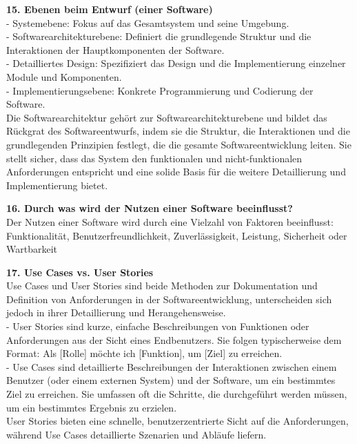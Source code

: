 \documentclass{article}
\begin{document}
\textbf{15. Ebenen beim Entwurf (einer Software)}\\
- Systemebene: Fokus auf das Gesamtsystem und seine Umgebung. \\
- Softwarearchitekturebene: Definiert die grundlegende Struktur und die Interaktionen der Hauptkomponenten der Software. \\
- Detailliertes Design: Spezifiziert das Design und die Implementierung einzelner Module und Komponenten. \\
- Implementierungsebene: Konkrete Programmierung und Codierung der Software. \\
Die Softwarearchitektur gehört zur Softwarearchitekturebene und bildet das Rückgrat des Softwareentwurfs, indem sie die Struktur, die Interaktionen und die grundlegenden Prinzipien festlegt, die die gesamte Softwareentwicklung leiten. Sie stellt sicher, dass das System den funktionalen und nicht-funktionalen Anforderungen entspricht und eine solide Basis für die weitere Detaillierung und Implementierung bietet.\\
\textbf{16. Durch was wird der Nutzen einer Software beeinflusst?}\\
Der Nutzen einer Software wird durch eine Vielzahl von Faktoren beeinflusst: Funktionalität, Benutzerfreundlichkeit, Zuverlässigkeit, Leistung, Sicherheit oder Wartbarkeit \\
\textbf{17. Use Cases vs. User Stories}\\
Use Cases und User Stories sind beide Methoden zur Dokumentation und Definition von Anforderungen in der Softwareentwicklung, unterscheiden sich jedoch in ihrer Detaillierung und Herangehensweise.\\
- User Stories sind kurze, einfache Beschreibungen von Funktionen oder Anforderungen aus der Sicht eines Endbenutzers. Sie folgen typischerweise dem Format: Als [Rolle] möchte ich [Funktion], um [Ziel] zu erreichen.\\
- Use Cases sind detaillierte Beschreibungen der Interaktionen zwischen einem Benutzer (oder einem externen System) und der Software, um ein bestimmtes Ziel zu erreichen. Sie umfassen oft die Schritte, die durchgeführt werden müssen, um ein bestimmtes Ergebnis zu erzielen.\\
User Stories bieten eine schnelle, benutzerzentrierte Sicht auf die Anforderungen, während Use Cases detaillierte Szenarien und Abläufe liefern.
\end{document}
